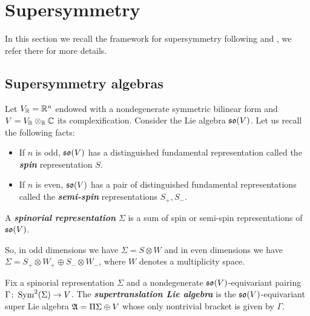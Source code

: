 \documentclass[10pt, oneside]{article}
\newcommand{\defterm}[1]{\textbf{\emph{#1}}}
\begin{document}
\section{Supersymmetry} \label{sec: susy}

In this section we recall the framework for supersymmetry following \cite{ElliottSafronov} and \cite{DeligneSpinors}, we refer there for more details.

\subsection{Supersymmetry algebras}

Let $V_\mathbb R = \mathbb R^n$ endowed with a nondegenerate symmetric bilinear form and $V=V_\mathbb R\otimes_\mathbb R\mathbb C$ its complexification. Consider the Lie algebra $\mathfrak{so}(V)$. Let us recall the following facts:
\begin{itemize}
\item If $n$ is odd, $\mathfrak{so}(V)$ has a distinguished fundamental representation called the \defterm{spin} representation $S$.

\item If $n$ is even, $\mathfrak{so}(V)$ has a pair of distinguished fundamental representations called the \defterm{semi-spin} representations $S_+, S_-$.
\end{itemize}

\begin{definition}
A \defterm{spinorial representation} $\Sigma$ is a sum of spin or semi-spin representations of $\mathfrak{so}(V)$.
\end{definition}

So, in odd dimensions we have $\Sigma=S\otimes W$ and in even dimensions we have $\Sigma=S_+\otimes W_+\oplus S_-\otimes W_-$, where $W$ denotes a multiplicity space.

\begin{definition}
Fix a spinorial representation $\Sigma$ and a nondegenerate $\mathfrak{so}(V)$-equivariant pairing $\Gamma\colon \operatorname{Sym}^2(\Sigma)\rightarrow V$. The \defterm{supertranslation Lie algebra} is the $\mathfrak{so}(V)$-equivariant super Lie algebra $\mathfrak A = \Pi\Sigma\oplus V$ whose only nontrivial bracket is given by $\Gamma$.
\end{definition}
\end{document}
